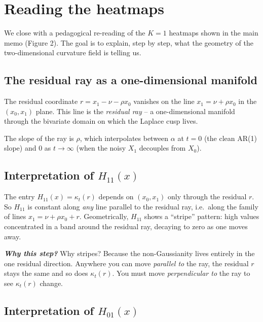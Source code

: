 \documentclass[11pt,a4paper,openany]{book}
\theoremstyle{plainserif}
\theoremstyle{definition}
\theoremstyle{remarkstyle}
\newenvironment{whybox}{%
  \begin{center}\begin{minipage}{0.95\linewidth}\small
  \textbf{\textit{Why this step?}}\quad\ignorespaces}{%
  \end{minipage}\end{center}}
\begin{document}
\chapter{Reading the heatmaps}
\label{ch:heatmaps}

We close with a pedagogical re-reading of the $K=1$ heatmaps shown in
the main memo (Figure 2). The goal is to explain, step by step, what
the geometry of the two-dimensional curvature field is telling us.

\section{The residual ray as a one-dimensional manifold}

The residual coordinate $r = x_1 - \nu - \rho x_0$ vanishes on the line
$x_1 = \nu + \rho x_0$ in the $(x_0, x_1)$ plane. This line is the
\emph{residual ray} -- a one-dimensional manifold through the bivariate
domain on which the Laplace cusp lives.

The slope of the ray is $\rho$, which interpolates between $\alpha$ at
$t=0$ (the clean AR(1) slope) and $0$ as $t\to\infty$ (when the noisy
$X_1$ decouples from $X_0$).

\section{Interpretation of $H_{11}(x)$}

The entry $H_{11}(x) = \kappa_t(r)$ depends on $(x_0, x_1)$ only through
the residual $r$. So $H_{11}$ is constant along \emph{any} line parallel
to the residual ray, i.e.\ along the family of lines
$x_1 = \nu + \rho x_0 + r$. Geometrically, $H_{11}$ shows a
``stripe'' pattern: high values concentrated in a band around the
residual ray, decaying to zero as one moves away.

\begin{whybox}
Why stripes? Because the non-Gaussianity lives entirely in the one
residual direction. Anywhere you can move \emph{parallel to} the ray,
the residual $r$ stays the same and so does $\kappa_t(r)$. You must move
\emph{perpendicular to} the ray to see $\kappa_t(r)$ change.
\end{whybox}

\section{Interpretation of $H_{01}(x)$}
\end{document}
